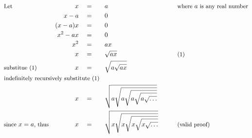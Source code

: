 \begin{alignat*}{7}
&\small\text{Let}\normalsize&x\quad&=\quad&&a\qquad&&\small\text{where }a\text{ is any real number}\normalsize\\
&\,&x-a\quad&=&&0\\
&\,&(x-a)x\quad&=&&0\\
&\,&x^2-ax\quad&=&&0\\
&\,&x^2\quad&=&&ax\\
&\,&x\quad&=&&\sqrt{ax}&&\small\text{(1)}\\
&\small\text{substitue (1)}\normalsize&x\quad&=&&\sqrt{a\sqrt{ax}}\\
&\rlap{\small\text{indefinitely recursively substitute (1)}\normalsize}\\
&\,&x\quad&=&&\sqrt{a\sqrt{a\sqrt{a\sqrt{a\sqrt{\ldots}}}}}\\
&\small\text{since }x=a\text{, thus}\normalsize&x\quad&=&&\sqrt{x\sqrt{x\sqrt{x\sqrt{x\sqrt{\ldots}}}}}\qquad&&\small\text{(valid proof)}
\end{alignat*}
